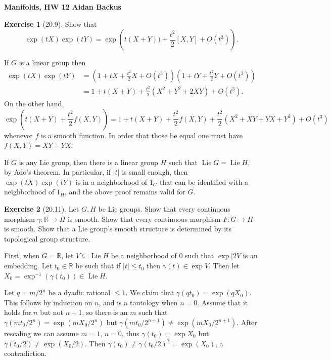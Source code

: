 \documentclass[10pt]{article}
\newcommand{\RR}{\mathbb{R}}
\DeclareMathOperator{\Lie}{Lie}
\theoremstyle{definition}
\newtheorem{exer}{Exercise}
\begin{document}
\noindent
\large\textbf{Manifolds, HW 12} \hfill \textbf{Aidan Backus} \\


\begin{exer}[20.9]
Show that
$$\exp(tX)\exp(tY) = \exp\left(t(X + Y)) + \frac{t^2}{2} [X, Y] + O(t^3)\right).$$
\end{exer}

If $G$ is a linear group then
\begin{align*}
\exp(tX)\exp(tY) &= \left(1 + tX + \frac{t^2}{2}X + O(t^3)\right)\left(1 + tY + \frac{t^2}{2}Y + O(t^3)\right)\\
&= 1 + t(X + Y) + \frac{t^2}{2}(X^2 + Y^2 + 2XY) + O(t^3).
\end{align*}
On the other hand,
$$\exp\left(t(X + Y) + \frac{t^2}{2} f(X, Y)\right) = 1 + t(X + Y) + \frac{t^2}{2} f(X, Y) + \frac{t^2}{2} (X^2 + XY + YX + Y^2) + O(t^3)$$
whenever $f$ is a smooth function.
In order that those be equal one must have $f(X, Y) = XY - YX$.

If $G$ is any Lie group, then there is a linear group $H$ such that $\Lie G = \Lie H$, by Ado's theorem.
In particular, if $|t|$ is small enough, then $\exp(tX)\exp(tY)$ is in a neighborhood of $1_G$ that can be identified with a neighborhood of $1_H$, and the above proof remains valid for $G$.

\begin{exer}[20.11]
Let $G, H$ be Lie groups. Show that every continuous morphism $\gamma: \RR \to H$ is smooth.
Show that every continuous morphism $F: G \to H$ is smooth.
Show that a Lie group's smooth structure is determined by its topological group structure.
\end{exer}

First, when $G = \RR$, let $V \subseteq \Lie H$ be a neighborhood of $0$ such that $\exp|2V$ is an embedding.
Let $t_0 \in \RR$ be such that if $|t| \leq t_0$ then $\gamma(t) \in \exp V$.
Then let $X_0 = \exp^{-1}(\gamma(t_0)) \in \Lie H$.

Let $q = m/2^n$ be a dyadic rational $\leq 1$. We claim that $\gamma(qt_0) = \exp(qX_0)$.
This follows by induction on $n$, and is a tautology when $n = 0$.
Assume that it holds for $n$ but not $n + 1$, so there is an $m$ such that $\gamma(mt_0/2^n) = \exp(mX_0/2^n)$ but $\gamma(mt_0/2^{n+1}) \neq \exp(mX_0/2^{n+1})$.
After rescaling we can assume $m = 1$, $n = 0$, thus $\gamma(t_0) = \exp X_0$ but $\gamma(t_0/2) \neq \exp(X_0/2)$.
Then $\gamma(t_0) \neq \gamma(t_0/2)^2 = \exp(X_0)$, a contradiction.
\end{document}
